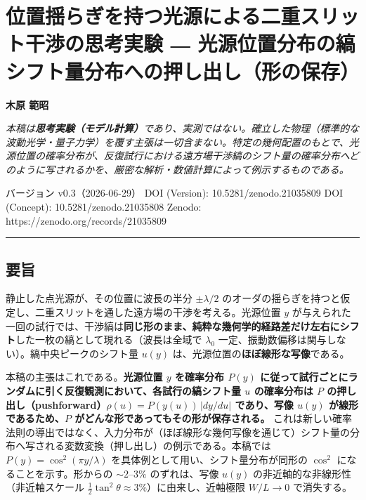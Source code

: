 \documentclass[
]{ltjsarticle}
\author{}
\date{}
\begin{document}
\section{位置揺らぎを持つ光源による二重スリット干渉の思考実験 ―
光源位置分布の縞シフト量分布への押し出し（形の保存）}\label{ux4f4dux7f6eux63faux3089ux304eux3092ux6301ux3064ux5149ux6e90ux306bux3088ux308bux4e8cux91cdux30b9ux30eaux30c3ux30c8ux5e72ux6e09ux306eux601dux8003ux5b9fux9a13-ux5149ux6e90ux4f4dux7f6eux5206ux5e03ux306eux7e1eux30b7ux30d5ux30c8ux91cfux5206ux5e03ux3078ux306eux62bcux3057ux51faux3057ux5f62ux306eux4fddux5b58}

\textbf{木原 範昭}

\emph{本稿は\textbf{思考実験（モデル計算）}であり、実測ではない。確立した物理（標準的な波動光学・量子力学）を覆す主張は一切含まない。特定の幾何配置のもとで、光源位置の確率分布が、反復試行における遠方場干渉縞のシフト量の確率分布へどのように写されるかを、厳密な解析・数値計算によって例示するものである。}

バージョン v0.3（2026-06-29） DOI (Version): 10.5281/zenodo.21035809 DOI
(Concept): 10.5281/zenodo.21035808 Zenodo:
https://zenodo.org/records/21035809

\begin{center}\rule{0.5\linewidth}{0.5pt}\end{center}

\subsection{要旨}\label{ux8981ux65e8}

静止した点光源が、その位置に波長の半分 \(\pm\lambda/2\)
のオーダの揺らぎを持つと仮定し、二重スリットを通した遠方場の干渉を考える。光源位置
\(y\)
が与えられた一回の試行では、干渉縞は\textbf{同じ形のまま、純粋な幾何学的経路差だけ左右にシフト}した一枚の縞として現れる（波長は全域で
\(\lambda_0\) 一定、振動数偏移は関与しない）。縞中央ピークのシフト量
\(u(y)\) は、光源位置の\textbf{ほぼ線形な写像}である。

本稿の主張はこれである。\textbf{光源位置 \(y\) を確率分布 \(P(y)\)
に従って試行ごとにランダムに引く反復観測において、各試行の縞シフト量
\(u\) の確率分布は \(P\)
の押し出し（pushforward）\(\rho(u)=P(y(u))\,|dy/du|\) であり、写像
\(u(y)\) が線形であるため、\(P\)
がどんな形であってもその形が保存される。}
これは新しい確率法則の導出ではなく、入力分布が（ほぼ線形な幾何写像を通じて）シフト量の分布へ写される変数変換（押し出し）の例示である。本稿では
\(P(y)=\cos^2(\pi y/\lambda)\) を具体例として用い、シフト量分布が同形の
\(\cos^2\) になることを示す。形からの \(\sim2\text{–}3\%\)
のずれは、写像 \(u(y)\) の非近軸的な非線形性（非近軸スケール
\(\tfrac12\tan^2\theta\approx3\%\)）に由来し、近軸極限 \(W/L\to0\)
で消失する。
\end{document}
